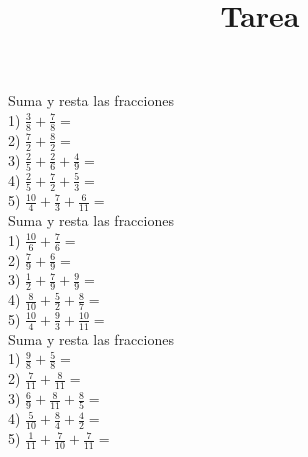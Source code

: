 \documentclass[a4paper,12pt]{article}
\title{Tarea}
\author{}
\date{}
\begin{document}
\maketitle
 Suma  y resta las fracciones\vspace{1cm}\\ 
1) $\frac{3}{8}+\frac{7}{8}=$\vspace{1cm}\\ 
2) $\frac{7}{2}+\frac{8}{2}=$\vspace{1cm}\\ 
3) $\frac{2}{5}+\frac{2}{6}+\frac{4}{9}  =$\vspace{1cm}\\ 
4) $\frac{2}{5}+\frac{7}{2}+\frac{5}{3}  =$\vspace{1cm}\\ 
5) $\frac{10}{4}+\frac{7}{3}+\frac{6}{11}  =$\vspace{1cm}\\ 

 \pagebreak 
 Suma  y resta las fracciones\vspace{1cm}\\ 
1) $\frac{10}{6}+\frac{7}{6}=$\vspace{1cm}\\ 
2) $\frac{7}{9}+\frac{6}{9}=$\vspace{1cm}\\ 
3) $\frac{1}{2}+\frac{7}{9}+\frac{9}{9}  =$\vspace{1cm}\\ 
4) $\frac{8}{10}+\frac{5}{2}+\frac{8}{7}  =$\vspace{1cm}\\ 
5) $\frac{10}{4}+\frac{9}{3}+\frac{10}{11}  =$\vspace{1cm}\\ 

 \pagebreak 
 Suma  y resta las fracciones\vspace{1cm}\\ 
1) $\frac{9}{8}+\frac{5}{8}=$\vspace{1cm}\\ 
2) $\frac{7}{11}+\frac{8}{11}=$\vspace{1cm}\\ 
3) $\frac{6}{9}+\frac{8}{11}+\frac{8}{5}  =$\vspace{1cm}\\ 
4) $\frac{5}{10}+\frac{8}{4}+\frac{4}{2}  =$\vspace{1cm}\\ 
5) $\frac{1}{11}+\frac{7}{10}+\frac{7}{11}  =$\vspace{1cm}\\ 
\end{document}
